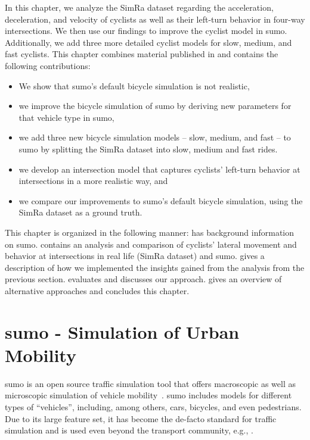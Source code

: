 In this chapter, we analyze the SimRa dataset regarding the acceleration, deceleration, and velocity of cyclists as well as their left-turn behavior in four-way intersections.
We then use our findings to improve the cyclist model in \ac{sumo}.
Additionally, we add three more detailed cyclist models for slow, medium, and fast cyclists.
This chapter combines material published in \cite{karakaya2022realistic,karakaya2023achieving} and contains the following contributions:
\begin{itemize}
    \item We show that \ac{sumo}'s default bicycle simulation is not realistic,
    \item we improve the bicycle simulation of \ac{sumo} by deriving new parameters for that vehicle type in \ac{sumo},
    \item we add three new bicycle simulation models -- slow, medium, and fast -- to \ac{sumo} by splitting the SimRa dataset into slow, medium and fast rides.
    \item we develop an intersection model that captures cyclists' left-turn behavior at intersections in a more realistic way, and
    \item we compare our improvements to \ac{sumo}'s default bicycle simulation, using the SimRa dataset as a ground truth.
\end{itemize}

This chapter is organized in the following manner:
 has background information on \ac{sumo}.
 contains an analysis and comparison of cyclists' lateral movement and behavior at intersections in real life (SimRa dataset) and \ac{sumo}.
 gives a description of how we implemented the insights gained from the analysis from the previous section.
 evaluates and  discusses our approach.
 gives an overview of alternative approaches and  concludes this chapter.

\section{\ac{sumo} - Simulation of Urban Mobility}
\label{sec:sumo_background}
\ac{sumo} is an open source traffic simulation tool that offers macroscopic as well as microscopic simulation of vehicle mobility~\cite{lopez2018microscopic}.
\ac{sumo} includes models for different types of ``vehicles'', including, among others, cars, bicycles, and even pedestrians.
Due to its large feature set, it has become the de-facto standard for traffic simulation and is used even beyond the transport community, e.g., \cite{beilharz2021towards}.

